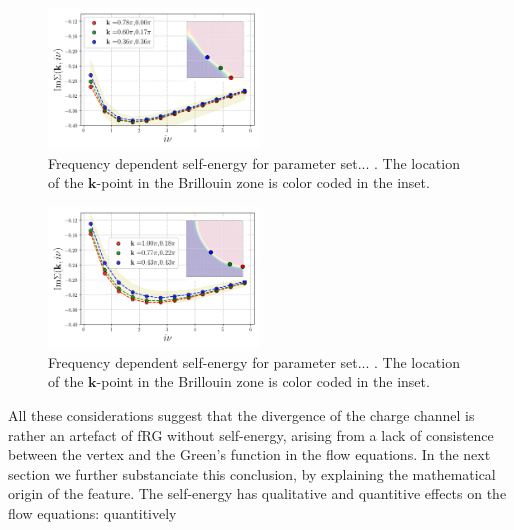 \begin{figure}
\includegraphics[width=0.50\textwidth]{images/Self_Im_occ0600.png}
\caption{Frequency dependent self-energy for parameter set... .
The location of the $\mathbf{k}$-point in the Brillouin zone is color coded in the inset. }
\label{fig:selffermi0600}
\end{figure}


\begin{figure}
\includegraphics[width=0.50\textwidth]{images/Self_Im_occ0975.png}
\caption{Frequency dependent self-energy for parameter set... .
The location of the $\mathbf{k}$-point in the Brillouin zone is color coded in the inset. }
\label{fig:selffermi0975}
\end{figure}


All these considerations suggest that the divergence of the charge channel is rather an artefact of fRG without self-energy, arising from a lack of consistence between the vertex and the Green's function in the flow equations. 
In the next section we further substanciate this conclusion, by explaining the mathematical origin of the feature. 
The self-energy has qualitative and quantitive effects on the flow equations: quantitively 


